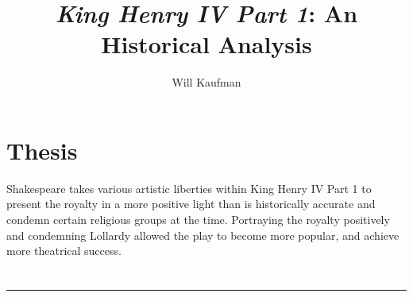 \documentclass[10pt]{article}
\begin{document}
\title{\textit{King Henry IV Part 1}: An Historical Analysis}
\author{Will Kaufman}
\maketitle
{}
\section*{Thesis}
Shakespeare takes various artistic liberties within King Henry IV Part 1 to present the royalty in a more positive light than is historically accurate and condemn certain religious groups at the time.  Portraying the royalty positively and condemning Lollardy allowed the play to become more popular, and achieve more theatrical success.

\section*{}

\noindent\rule{\textwidth}{1pt}
\end{document}
